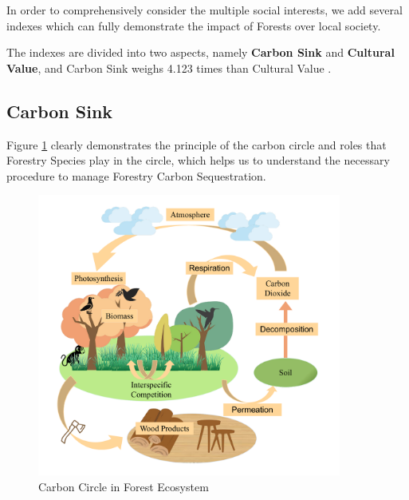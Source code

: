 \documentclass{mcmthesis}
\numberwithin{figure}{section}
\numberwithin{table}{section}
\numberwithin{equation}{section}
\begin{document}
In order to comprehensively consider the multiple social interests, we add
several indexes which can fully demonstrate the impact of Forests over local 
society. 
\par
The indexes are divided into two aspects, namely \textbf{Carbon Sink} and \textbf{Cultural Value}, and
Carbon Sink weighs 4.123 times than Cultural Value \citep{2007US}. 

\subsection{Carbon Sink}
Figure \ref{CarbonCircle} clearly demonstrates the principle of the carbon circle and roles that Forestry Species play in the 
circle, which helps us to understand the necessary procedure to manage Forestry Carbon Sequestration.

\begin{figure}[htbp]
  \centering
  \includegraphics[width = 10cm]{code&pic/大循环.pdf}
  \caption{Carbon Circle in Forest Ecosystem}\label{CarbonCircle}
\end{figure}
\end{document}
